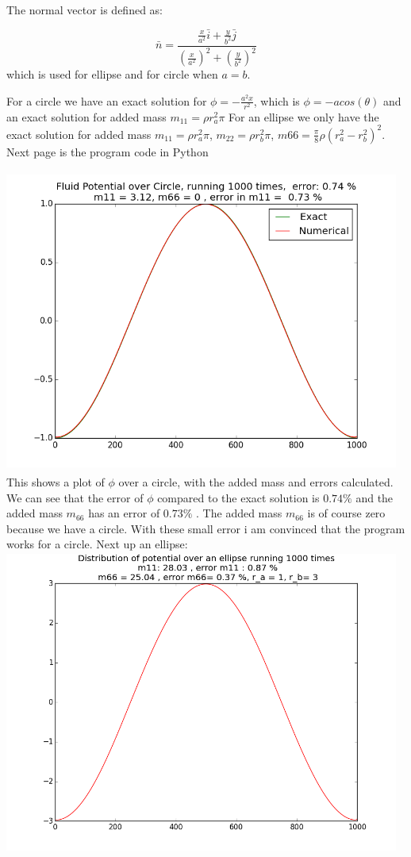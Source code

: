 \documentclass[a4paper,norsk]{article}
\begin{document}
The normal vector is defined as:

$$\bar{n} = \frac{\frac{x}{a^2}\bar{i} + \frac{y}{b^2}\bar{j} } { (\frac{x}{a^2})^2 + (\frac{y}{b^2})^2 }$$
which is used for ellipse and for circle when $a=b$.

For a circle we have an exact solution for $\phi =-\frac{a^2x}{r^2} $, which is $\phi = -a cos(\theta)$ and an exact solution for added mass $m_{11} = \rho r_a^2 \pi $
\newline
For an ellipse we only have the exact solution for added mass $m_{11} = \rho r_a^2 \pi$, $   m_{22} = \rho r_b^2 \pi $,   $m{66} = \frac{\pi}{8}\rho(r_a^2-r_b^2)^2 $.
\newline
Next page is the program code in Python
\newpage

\newpage

\includegraphics[width=13cm, height=10cm]{Circle}
\newline
This shows a plot of $\phi$ over a circle, with the added mass and errors calculated.
\newline
We can see that the error of $\phi$ compared to the exact solution is $0.74  \%$ 
and the added mass $m_{66}$ has an error of $0.73 \% $ . The added mass $m_{66}$ is of course zero because we have a circle.
With these small error i am convinced that the program works for a circle. Next up an ellipse:
\newpage
\includegraphics[width=13cm, height=10cm]{ellipse}
\end{document}
